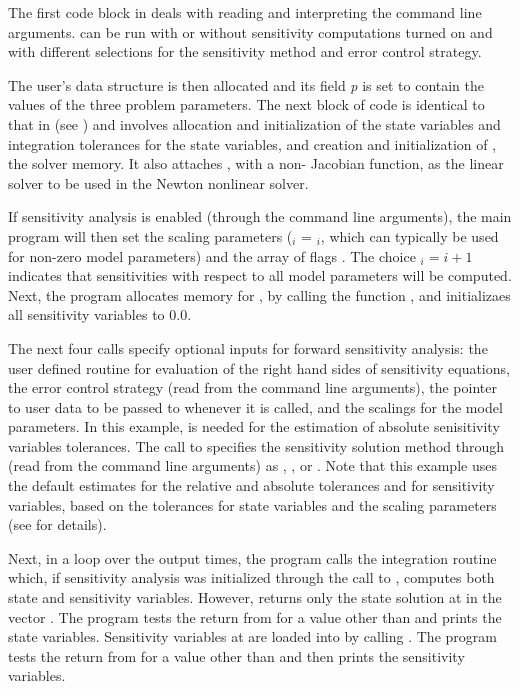 The first code block in  deals with reading and interpreting the
command line arguments.  can be run with or without sensitivity computations
turned on and with different selections for the sensitivity method and error control strategy.

The user's data structure is then allocated and its field {\em p} is set to contain
the values of the three problem parameters.
The next block of code is identical to that in  (see \cite{cvode2.2.0_ex})
and involves allocation and initialization of the state variables and integration 
tolerances for the state variables, and creation and initialization of , 
the {\cvodes} solver memory. 
It also attaches {\cvdense}, with a non- Jacobian function, as the linear solver 
to be used in the Newton nonlinear solver.

If sensitivity analysis is enabled (through the command line arguments), 
the main program will then set the scaling parameters
 ($_i$ = $_i$, which can typically be used for 
non-zero model parameters) and the array of flags . The choice $_i=i+1$
indicates that sensitivities with respect to all model parameters will be computed.
Next, the program allocates memory for , by calling the {\nvecs} function 
, and initializaes all sensitivity variables to $0.0$.

The next four calls specify optional inputs for forward sensitivity analysis:
the user defined routine for evaluation of the right hand
sides of sensitivity equations, the error control strategy
(read from the command line arguments), the pointer to
user data to be passed to  whenever it is called, and  
the scalings for the model parameters. In this example,  is needed for the 
estimation of absolute senisitivity variables tolerances.
The call to  specifies the sensitivity solution method through 
 (read from the command line arguments) as , 
, or .
Note that this example uses the default estimates for the relative and absolute tolerances 
 and  for sensitivity variables, based on the tolerances for state 
variables and the scaling parameters  (see  for details).

Next, in a loop over the  output times, the program calls the integration
routine  which, if sensitivity analysis was initialized through the call
to , computes both state and sensitivity variables. However,
 returns only the state solution at  in the vector .
The program tests the return from  for a value other than  and
prints the state variables.
Sensitivity variables at  are loaded into  by calling .
The program tests the return from  for a value other than  
and then prints the sensitivity variables.

